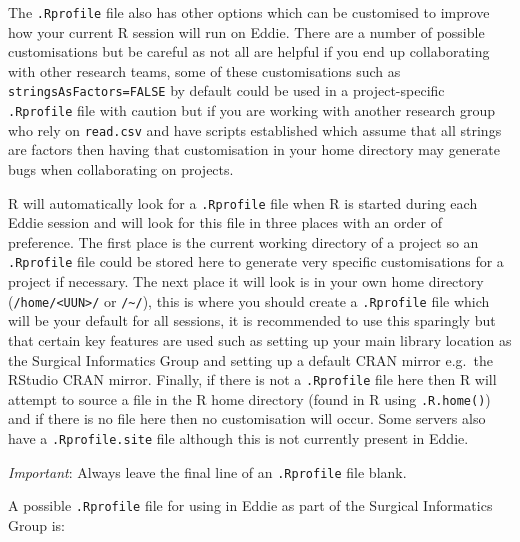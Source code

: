 \documentclass[
]{book}
\begin{document}
The \texttt{.Rprofile} file also has other options which can be customised to improve how your current R session will run on Eddie. There are a number of possible customisations but be careful as not all are helpful if you end up collaborating with other research teams, some of these customisations such as \texttt{stringsAsFactors=FALSE} by default could be used in a project-specific \texttt{.Rprofile} file with caution but if you are working with another research group who rely on \texttt{read.csv} and have scripts established which assume that all strings are factors then having that customisation in your home directory may generate bugs when collaborating on projects.

R will automatically look for a \texttt{.Rprofile} file when R is started during each Eddie session and will look for this file in three places with an order of preference. The first place is the current working directory of a project so an \texttt{.Rprofile} file could be stored here to generate very specific customisations for a project if necessary. The next place it will look is in your own home directory (\texttt{/home/\textless{}UUN\textgreater{}/} or \texttt{/\textasciitilde{}/}), this is where you should create a \texttt{.Rprofile} file which will be your default for all sessions, it is recommended to use this sparingly but that certain key features are used such as setting up your main library location as the Surgical Informatics Group and setting up a default CRAN mirror e.g.~the RStudio CRAN mirror. Finally, if there is not a \texttt{.Rprofile} file here then R will attempt to source a file in the R home directory (found in R using \texttt{.R.home()}) and if there is no file here then no customisation will occur. Some servers also have a \texttt{.Rprofile.site} file although this is not currently present in Eddie.

\emph{Important}: Always leave the final line of an \texttt{.Rprofile} file blank.

A possible \texttt{.Rprofile} file for using in Eddie as part of the Surgical Informatics Group is:
\end{document}

